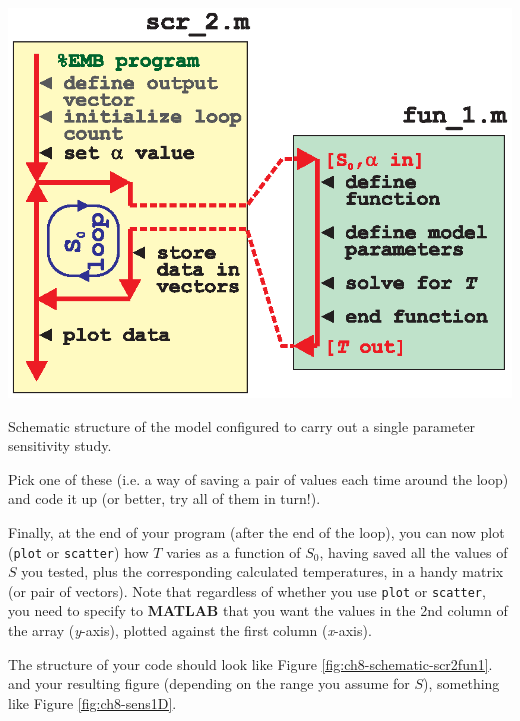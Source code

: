 \documentclass{tufte-book} %
\begin{document}
\begin{marginfigure}[-0.0in]
\includegraphics[width=\linewidth]{ch8-schematic-scr2fun1.eps}
\caption{Schematic structure of the model configured to carry out a single parameter sensitivity study.}
\label{fig:ch8-schematic-scr2fun1}
\end{marginfigure}

Pick one of these (i.e. a way of saving a pair of values each time around the loop) and code it up (or better, try all of them in turn!).

Finally, at the end of your program (after the end of the loop), you can now plot (\texttt{plot} or \texttt{scatter}) how \(T\) varies as a function of \(S_{0}\), having saved all the values of \(S\) you tested, plus the corresponding calculated temperatures, in a handy matrix (or pair of vectors). Note that regardless of whether you use \texttt{plot} or \texttt{scatter}, you need to specify to \textbf{MATLAB} that you want the values in the 2nd column of the array (\textit{y}-axis), plotted against the first column (\textit{x}-axis).

The structure of your code should look like Figure \ref{fig:ch8-schematic-scr2fun1}. and your resulting figure (depending on the range you assume for \(S\)), something like Figure \ref{fig:ch8-sens1D}.

\end{document}
